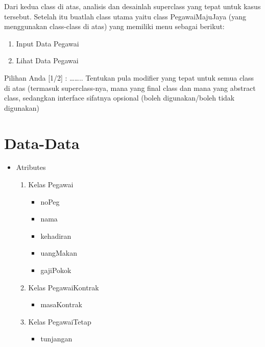 \documentclass[11pt]{article}
\begin{document}
Dari kedua class di atas, analisis dan desainlah superclass yang tepat untuk kasus tersebut. Setelah itu buatlah class utama yaitu class PegawaiMajuJaya (yang menggunakan class-class di atas) yang memiliki menu sebagai berikut:
\begin{enumerate}
\item Input Data Pegawai
\item Lihat Data Pegawai
\end{enumerate}
Pilihan Anda [1/2] : ……..
Tentukan pula modifier yang tepat untuk semua class di atas (termasuk superclass-nya, mana yang final class dan mana yang abstract class, sedangkan interface sifatnya opsional (boleh digunakan/boleh tidak digunakan)


\section{Data-Data}
\label{sec:org03057fc}
\begin{itemize}
\item Atributes
\begin{enumerate}
\item Kelas Pegawai
\begin{itemize}
\item noPeg
\item nama
\item kehadiran
\item uangMakan
\item gajiPokok
\end{itemize}
\item Kelas PegawaiKontrak
\begin{itemize}
\item masaKontrak
\end{itemize}
\item Kelas PegawaiTetap
\begin{itemize}
\item tunjangan
\end{itemize}
\end{enumerate}
\end{itemize}
\end{document}
